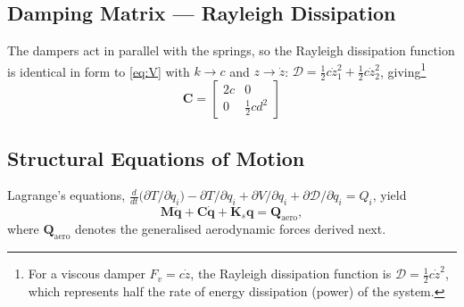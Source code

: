 \documentclass[
	a4paper, %
	10pt, %
]{CSUniSchoolLabReport}
\begin{document}
\subsection{Damping Matrix --- Rayleigh Dissipation}
The dampers act in parallel with the springs, so the Rayleigh dissipation function is
identical in form to \eqref{eq:V} with \(k\!\to\!c\) and \(z\!\to\!\dot z\):
\(\mathcal D=\tfrac12 c\dot z_1^2+\tfrac12 c\dot z_2^2\), giving\footnote{For a viscous damper \(F_{v}=c\dot{z}\), the Rayleigh dissipation function is \(\mathcal{D}=\frac{1}{2}c\dot{z}^{2}\), which represents half the rate of energy dissipation (power) of the system.}
\begin{equation}
    \boxed{\;\mathbf C=\begin{bmatrix} 2c & 0\\[2pt] 0 & \tfrac12 c d^2 \end{bmatrix}\;}
    \label{eq:C}
\end{equation}

\subsection{Structural Equations of Motion}
Lagrange's equations,
\(\frac{d}{dt}\!\big(\partial T/\partial\dot q_i\big)-\partial T/\partial q_i
+\partial V/\partial q_i+\partial\mathcal D/\partial\dot q_i=Q_i\),
yield
\begin{equation}
    \mathbf M\ddot{\mathbf q}+\mathbf C\dot{\mathbf q}+\mathbf K_s\mathbf q=\mathbf Q_{\text{aero}},
    \label{eq:struct-eom}
\end{equation}
where \(\mathbf Q_{\text{aero}}\) denotes the generalised aerodynamic forces derived next.
\end{document}

